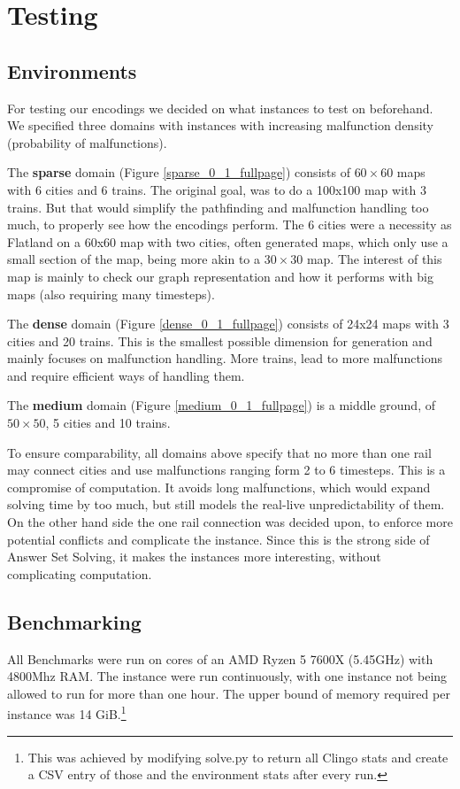 \section{Testing}
\subsection{Environments}
For testing our encodings we decided on what instances to test on beforehand. We specified three domains with instances with increasing malfunction density (probability of malfunctions).

The \textbf{sparse} domain (Figure \ref{sparse_0_1_fullpage}) consists of $60\times60$ maps with 6 cities and 6 trains. The original goal, was to do a 100x100 map with 3 trains. But that would simplify the pathfinding and malfunction handling too much, to properly see how the encodings perform. The 6 cities were a necessity as Flatland on a 60x60 map with two cities, often generated maps, which only use a small section of the map, being more akin to a $30\times30$ map. The interest of this map is mainly to check our graph representation and how it performs with big maps (also requiring many timesteps).

The \textbf{dense} domain (Figure \ref{dense_0_1_fullpage}) consists of 24x24 maps with 3 cities and 20 trains. This is the smallest possible dimension for generation and mainly focuses on malfunction handling. More trains, lead to more malfunctions and require efficient ways of handling them.

The \textbf{medium} domain (Figure \ref{medium_0_1_fullpage}) is a middle ground, of $50\times50$, 5 cities and 10 trains.

To ensure comparability, all domains above specify that no more than one rail may connect cities and use malfunctions ranging form 2 to 6 timesteps. This is a compromise of computation. It avoids long malfunctions, which would expand solving time by too much, but still models the real-live unpredictability of them. On the other hand side the one rail connection was decided upon, to enforce more potential conflicts and complicate the instance. Since this is the strong side of Answer Set Solving, it makes the instances more interesting, without complicating computation.

\subsection{Benchmarking}
All Benchmarks were run on cores of an AMD Ryzen 5 7600X (5.45GHz) with 4800Mhz RAM. The instance were run continuously, with one instance not being allowed to run for more than one hour. The upper bound of memory required per instance was 14 GiB.\footnote{This was achieved by modifying solve.py to return all Clingo stats and create a CSV entry of those and the environment stats after every run.}

